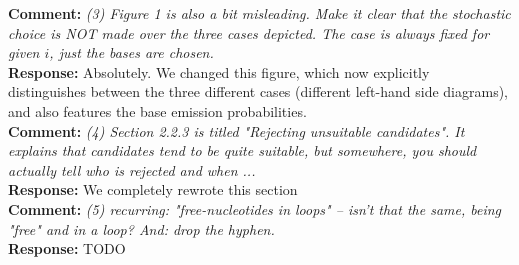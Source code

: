 \documentclass[11pt,hyperref,draft]{article} %
\newcommand{\Answer}[1]{\noindent\textsf{\textbf{Response: }}{\sf#1}\\}
\newcommand{\Comment}[1]{\noindent\textsf{\textbf{Comment: }}{\it#1}\\[.5em]}
\begin{document}
\Comment{(3) Figure 1 is also a bit misleading. Make it clear that the stochastic choice is NOT made over the three cases depicted. The case is always fixed for given $i$, just the bases are chosen.}
\Answer{Absolutely. We changed this figure, which now explicitly distinguishes between the three different cases (different left-hand side diagrams), and also features the base emission probabilities.}

\Comment{(4) Section 2.2.3 is titled "Rejecting unsuitable candidates". It explains that candidates tend to be quite suitable, but somewhere, you should actually tell who is rejected and when ... }
\Answer{We completely rewrote this section}

\Comment{(5) recurring: "free-nucleotides in loops" -- isn't that the same, being "free" and in a loop? And: drop the hyphen.}
\Answer{TODO}




\end{document}

